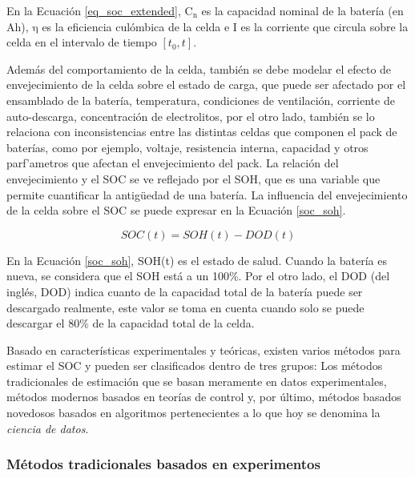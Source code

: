 \documentclass[10pt,a4paper]{article}
\begin{document}
\noindent En la Ecuaci\'on \ref{eq_soc_extended}, $\mathrm{C_n}$ es la 
capacidad nominal de la bater\'ia (en Ah), $\mathrm{\eta}$ es la eficiencia 
cul\'ombica de la celda e I es la corriente que circula sobre la celda en el 
intervalo de tiempo $[t_{0}, t]$.

\noindent Adem\'as del comportamiento de la celda, tambi\'en se debe modelar el
efecto de envejecimiento de la celda sobre el estado de carga, que puede ser
afectado por el ensamblado de la bater\'ia, temperatura, condiciones de
ventilaci\'on, corriente de auto-descarga, concentraci\'on de electrolitos, por
el otro lado, tambi\'en se lo relaciona con inconsistencias entre las distintas
celdas que componen el pack de bater\'ias, como por ejemplo, voltaje,
resistencia interna, capacidad y otros parf'ametros que afectan el 
envejecimiento del pack. La relaci\'on del envejecimiento y el \acrshort{SOC} se
ve reflejado por el \acrshort{SOH}, que es una variable que permite cuantificar
la antigüedad de una bater\'ia. La influencia del envejecimiento de la celda
sobre el \acrshort{SOC} se puede expresar en la Ecuaci\'on \ref{soc_soh}.

\begin{equation}
    SOC(t) = SOH(t) - DOD(t) \label{soc_soh}
\end{equation}

\noindent En la Ecuaci\'on \ref{soc_soh}, SOH(t) es el estado de salud. 
Cuando la bater\'ia es nueva, se considera que el SOH est\'a a un 100\%. 
Por el otro lado, el \acrshort{DOD} (del ingl\'es, \acrlong{DOD}) indica cuanto 
de la capacidad total de la bater\'ia puede ser descargado realmente, este valor 
se toma en cuenta cuando solo se puede descargar el 80\% de la capacidad total 
de la celda.

\noindent Basado en caracter\'isticas experimentales y te\'oricas, existen 
varios m\'etodos para estimar el \acrshort{SOC} y pueden ser clasificados dentro 
de tres grupos: Los m\'etodos tradicionales de estimaci\'on que se basan 
meramente en datos experimentales, m\'etodos modernos basados en teor\'ias de 
control y, por \'ultimo, m\'etodos basados novedosos basados en algoritmos
pertenecientes a lo que hoy se denomina la \emph{ciencia de datos}.

\subsubsection{M\'etodos tradicionales basados en experimentos}
\label{tradSocMeth}
\end{document}
